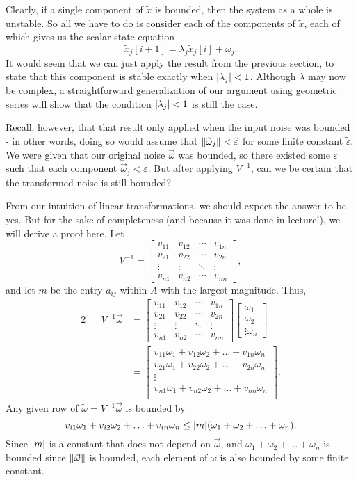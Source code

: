 \documentclass[letterpaper]{article}
\theoremstyle{remark}
\newcommand{\eps}{{\varepsilon}}    %
\renewcommand{\tilde}[1]{\widetilde{#1}}
\newcommand{\mat}[1]{\ensuremath{\begin{bmatrix}#1\end{bmatrix}}}
\newcommand{\eqn}[1]{\begin{alignat*}{2}#1\end{alignat*}}
\begin{document}
Clearly, if a single component of $\tilde{x}$ is bounded, then the system as a whole is unstable. So all we have to do is consider each of the components of $\tilde{x}$, each of which gives us the scalar state equation
\[
    \tilde{x}_j[i + 1] = \lambda_j \tilde{x}_j[i] + \tilde{\omega}_j.
\]
It would seem that we can just apply the result from the previous section, to state that this component is stable exactly when $\abs{\lambda_j} < 1$. Although $\lambda$ may now be complex, a straightforward generalization of our argument using geometric series will show that the condition $\abs{\lambda_j} < 1$ is still the case.

Recall, however, that that result only applied when the input noise was bounded - in other words, doing so would assume that $\norm{\tilde{\omega}_j} < \tilde{\eps}$ for some finite constant $\tilde{\eps}$. We were given that our original noise $\vec{\omega}$ was bounded, so there existed some $\eps$ such that each component $\vec{\omega}_j < \eps$. But after applying $V^{-1}$, can we be certain that the transformed noise is still bounded? 

From our intuition of linear transformations, we should expect the answer to be yes. But for the sake of completeness (and because it was done in lecture!), we will derive a proof here. Let
\[
    V^{-1} = \mat{
    v_{11} & v_{12} & \cdots & v_{1n} \\
    v_{21} & v_{22} & \cdots & v_{2n} \\
    \vdots & \vdots & \ddots & \vdots \\
    v_{n1} & v_{n2} & \cdots & v_{nn}
    },
\]
and let $m$ be the entry $a_{ij}$ within $A$ with the largest magnitude. Thus,
\eqn{
    && V^{-1}\vec{\omega} &= \mat{
    v_{11} & v_{12} & \cdots & v_{1n} \\
    v_{21} & v_{22} & \cdots & v_{2n} \\
    \vdots & \vdots & \ddots & \vdots \\
    v_{n1} & v_{n2} & \cdots & v_{nn}
    } \mat{\omega_1 \\ \omega_2 \\ \vdots \omega_n} \\
    &&&= \mat{
    v_{11}\omega_1 + v_{12}\omega_2 + \ldots + v_{1n}\omega_n \\
    v_{21}\omega_1 + v_{22}\omega_2 + \ldots + v_{2n}\omega_n \\
    \vdots \\
    v_{n1}\omega_1 + v_{n2}\omega_2 + \ldots + v_{nn}\omega_n \\
    }.
}
Any given row of $\tilde{\omega} = V^{-1}\vec{\omega}$ is bounded by
\[
    v_{i1}\omega_1 + v_{i2}\omega_2 + \ldots + v_{in}\omega_n \le \abs{m}(\omega_1 + \omega_2 + \ldots + \omega_n).
\]
Since $\abs{m}$ is a constant that does not depend on $\vec{\omega}$, and $\omega_1 + \omega_2 + \ldots + \omega_n$ is bounded since $\norm{\vec{\omega}}$ is bounded, each element of $\tilde{\omega}$ is also bounded by some finite constant.
\end{document}
